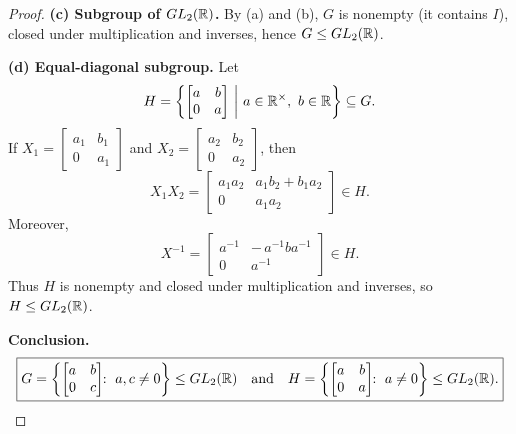 \documentclass[12pt]{article}
\theoremstyle{definition}
\begin{document}
\begin{proof}
\smallskip
\textbf{(c) Subgroup of $GL_2(\Bbb R)$.}
By (a) and (b), $G$ is nonempty (it contains $I$), closed under multiplication and inverses, hence $G\le GL_2(\Bbb R)$.

\smallskip
\textbf{(d) Equal-diagonal subgroup.}
Let
\[
H=\left\{\begin{bmatrix}a&b\\ 0&a\end{bmatrix}\ \middle|\ a\in\Bbb R^\times,\ b\in\Bbb R\right\}\subseteq G.
\]
If $X_1=\begin{bmatrix}a_1&b_1\\ 0&a_1\end{bmatrix}$ and $X_2=\begin{bmatrix}a_2&b_2\\ 0&a_2\end{bmatrix}$, then
\[
X_1X_2=\begin{bmatrix}
a_1a_2 & a_1b_2+b_1a_2\\
0 & a_1a_2
\end{bmatrix}\in H.
\]
Moreover,
\[
X^{-1}
=\begin{bmatrix}
a^{-1} & -\,a^{-1}ba^{-1}\\
0 & a^{-1}
\end{bmatrix}\in H.
\]
Thus $H$ is nonempty and closed under multiplication and inverses, so $H\le GL_2(\Bbb R)$.

\smallskip
\noindent\textbf{Conclusion.}
\[
\boxed{
G=\left\{\begin{bmatrix}a&b\\ 0&c\end{bmatrix}\!\!:\ a,c\neq0\right\}\le GL_2(\Bbb R)
\quad\text{and}\quad
H=\left\{\begin{bmatrix}a&b\\ 0&a\end{bmatrix}\!\!:\ a\neq0\right\}\le GL_2(\Bbb R).
}
\]
\end{proof}

\newpage
\end{document}
